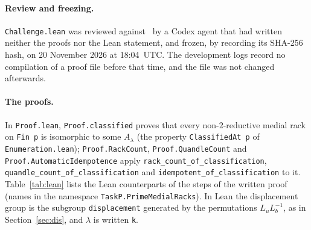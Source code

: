 \documentclass[11pt]{article}
\theoremstyle{definition}
\theoremstyle{remark}
\begin{document}
{\paragraph{Review and freezing.}
\texttt{Challenge.lean} was reviewed against~\cite{vy} by a Codex agent that
had written neither the proofs nor the Lean statement, and frozen, by recording
its SHA-256 hash, on 20 November 2026 at 18:04~UTC. The development logs record
no compilation of a proof file before that time, and the file was not changed
afterwards.

\paragraph{The proofs.}
In \texttt{Proof.lean}, \texttt{Proof.classified} proves that every
non-$2$-reductive medial rack on \texttt{Fin p} is isomorphic to some
$A_\lambda$ (the property \texttt{ClassifiedAt p} of
\texttt{Enumeration.lean}); \texttt{Proof.RackCount},
\texttt{Proof.QuandleCount} and \texttt{Proof.\allowbreak AutomaticIdempotence}
apply \texttt{rack\_\allowbreak count\_\allowbreak of\_\allowbreak classification},
\texttt{quandle\_\allowbreak count\_\allowbreak of\_\allowbreak classification}
and \texttt{idempotent\_\allowbreak of\_\allowbreak classification} to it.
Table~\ref{tab:lean} lists the Lean counterparts of the steps of the written
proof (names in the namespace \texttt{TaskP.PrimeMedialRacks}). In Lean the
displacement group is the subgroup \texttt{displacement} generated by the
permutations $L_uL_b^{-1}$, as in Section~\ref{sec:dis}, and $\lambda$ is
written \texttt{k}.

}
\end{document}
